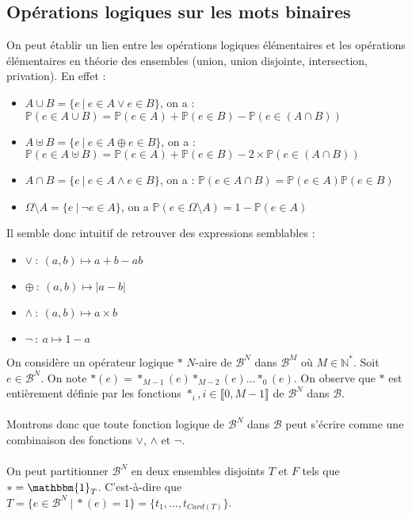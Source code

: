 \documentclass[../main.tex]{subfiles}
\begin{document}
\subsection{Opérations logiques sur les mots binaires}
 On peut établir un lien entre les opérations logiques élémentaires et les opérations élémentaires en théorie des ensembles (union, union disjointe, intersection, privation). En effet :
\begin{itemize}
	\item $A\cup{B} = \{e\ |\ e\in{A}\vee e\in{B}\}$, on a : $\mathbb{P}(e\in A\cup{B}) = \mathbb{P}(e\in A) + \mathbb{P}(e\in B) - \mathbb{P}(e\in (A\cap B))$
	\item $A\uplus{B} = \{e\ |\ e\in{A}\oplus e\in{B}\}$, on a : $\mathbb{P}(e\in A\uplus{B}) = \mathbb{P}(e\in A) + \mathbb{P}(e\in B) - 2\times\mathbb{P}(e\in (A\cap B))$
	\item $A\cap{B} = \{e\ |\ e\in{A}\wedge e\in{B}\}$, on a : $\mathbb{P}(e\in A\cap{B}) = \mathbb{P}(e\in A)\mathbb{P}(e\in B)$
	\item $\Omega\setminus{A} = \{e\ |\ \neg e\in{A}\}$, on a $\mathbb{P}(e\in{\Omega\setminus{A}}) = 1 - \mathbb{P}(e\in{A})$
\end{itemize}
Il semble donc intuitif de retrouver des expressions semblables :
\begin{itemize}
	\item $\vee\ :\ (a, b) \mapsto a + b - ab$
	\item $\oplus\ :\ (a, b) \mapsto |a - b|$
	\item $\wedge\ :\ (a, b) \mapsto a\times b$
	\item $\neg\ :\ a \mapsto 1 - a$
\end{itemize}
On considère un opérateur logique $\ast$ $N$-aire de $\mathcal{B}^{N}$ dans $\mathcal{B}^{M}$ où $M\in{\mathbb{N}^{*}}$. Soit $e\in{\mathcal{B}^{N}}$. On note $\ast(e) = \ast_{M-1}(e)\ast_{M-2}(e)\dots\ast_{0}(e)$. On observe que $\ast$ est entièrement définie par les fonctions $\ast_{i}, i\in{\llbracket0, M-1\rrbracket}$ de $\mathcal{B}^{N}$ dans $\mathcal{B}$.
\\ \\
Montrons donc que toute fonction logique de $\mathcal{B}^{N}$ dans $\mathcal{B}$ peut s'écrire comme une combinaison des fonctions $\vee$, $\wedge$ et $\neg$.
\\ \\
On peut partitionner $\mathcal{B}^{N}$ en deux ensembles disjoints $T$ et $F$ tels que $\ast = \mathbbm{1}_{T}$. C'est-à-dire que $T = \{e\in\mathcal{B}^{N}\ |\ \ast(e) = 1\} = \{t_{1}, \dots, t_{Card(T)}\}$.
\end{document}
